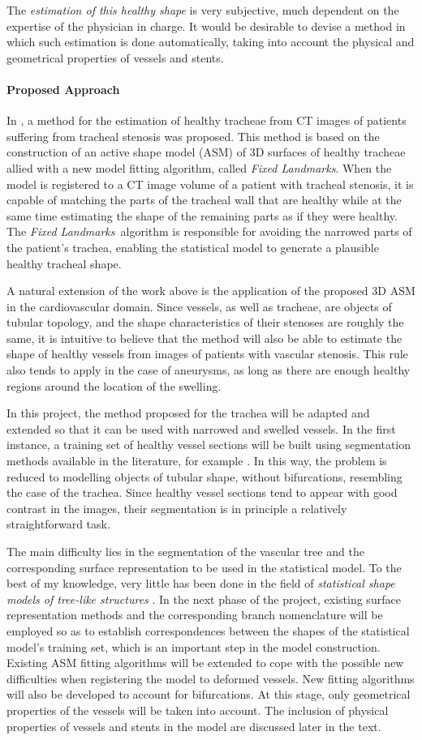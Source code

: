 \documentclass[a4paper]{article}
\newcommand{\fixedland}{{\it Fixed Landmarks}}
\newcommand{\approach}{\paragraph{Proposed Approach}}
\newcommand{\citep}{\cite}
\begin{document}
The {\em estimation of this healthy shape} is very subjective, much dependent on the expertise of the physician in charge. It would be desirable to devise a method in which such estimation is done automatically, taking into account the physical and geometrical properties of vessels and stents.

\approach
In \citep{Pinho:Trachea4}, a method for the estimation of healthy tracheae from CT images of patients suffering from tracheal stenosis was proposed. This method is based on the construction of an active shape model (ASM) \citep{Cootes} of 3D surfaces of healthy tracheae allied with a new model fitting algorithm, called \fixedland. When the model is registered to a CT image volume of a patient with tracheal stenosis, it is capable of matching the parts of the tracheal wall that are healthy while at the same time estimating the shape of the remaining parts as if they were healthy. The \fixedland\ algorithm is responsible for avoiding the narrowed parts of the patient's trachea, enabling the statistical model to generate a plausible healthy tracheal shape.

A natural extension of the work above is the application of the proposed 3D ASM in the cardiovascular domain. Since vessels, as well as tracheae, are objects of tubular topology, and the shape characteristics of their stenoses are roughly the same, it is intuitive to believe that the method will also be able to estimate the shape of healthy vessels from images of patients with vascular stenosis. This rule also tends to apply in the case of aneurysms, as long as there are enough healthy regions around the location of the swelling.

In this project, the method proposed for the trachea will be adapted and extended so that it can be used with narrowed and swelled vessels. In the first instance, a training set of healthy vessel sections will be built using segmentation methods available in the literature, for example \citep{Florez2}. In this way, the problem is reduced to modelling objects of tubular shape, without bifurcations, resembling the case of the trachea. Since healthy vessel sections tend to appear with good contrast in the images, their segmentation is in principle a relatively straightforward task. 

The main difficulty lies in the segmentation of the vascular tree and the corresponding surface representation to be used in the statistical model. To the best of my knowledge, very little has been done in the field of {\em statistical shape models of tree-like structures} \citep{Feragen}. In the next phase of the project, existing surface representation methods \citep{Florez, Antiga} and the corresponding branch nomenclature will be employed so as to establish correspondences between the shapes of the statistical model's training set, which is an important step in the model construction. Existing ASM fitting algorithms will be extended to cope with the possible new difficulties when registering the model to deformed vessels. New fitting algorithms will also be developed to account for bifurcations. At this stage, only geometrical properties of the vessels will be taken into account. The inclusion of physical properties of vessels and stents in the model are discussed later in the text. 
\end{document}

